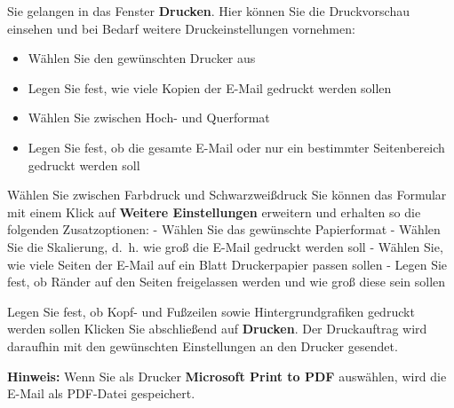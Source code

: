 \documentclass[
  letterpaper,
  DIV=11,
  numbers=noendperiod]{scrreprt}
\providecommand{\tightlist}{%
  \setlength{\itemsep}{0pt}\setlength{\parskip}{0pt}}\usepackage{longtable,booktabs,array}
\begin{document}
Sie gelangen in das Fenster \textbf{Drucken}. Hier können Sie die
Druckvorschau einsehen und bei Bedarf weitere Druckeinstellungen
vornehmen:

\begin{itemize}
\tightlist
\item
  Wählen Sie den gewünschten Drucker aus
\item
  Legen Sie fest, wie viele Kopien der E-Mail gedruckt werden sollen
\item
  Wählen Sie zwischen Hoch- und Querformat
\item
  Legen Sie fest, ob die gesamte E-Mail oder nur ein bestimmter
  Seitenbereich gedruckt werden soll
\end{itemize}

Wählen Sie zwischen Farbdruck und Schwarzweißdruck Sie können das
Formular mit einem Klick auf \textbf{Weitere Einstellungen} erweitern
und erhalten so die folgenden Zusatzoptionen: - Wählen Sie das
gewünschte Papierformat - Wählen Sie die Skalierung, d.~h. wie groß die
E-Mail gedruckt werden soll - Wählen Sie, wie viele Seiten der E-Mail
auf ein Blatt Druckerpapier passen sollen - Legen Sie fest, ob Ränder
auf den Seiten freigelassen werden und wie groß diese sein sollen

Legen Sie fest, ob Kopf- und Fußzeilen sowie Hintergrundgrafiken
gedruckt werden sollen Klicken Sie abschließend auf \textbf{Drucken}.
Der Druckauftrag wird daraufhin mit den gewünschten Einstellungen an den
Drucker gesendet.

\textbf{Hinweis:} Wenn Sie als Drucker \textbf{Microsoft Print to PDF}
auswählen, wird die E-Mail als PDF-Datei gespeichert.
\end{document}
